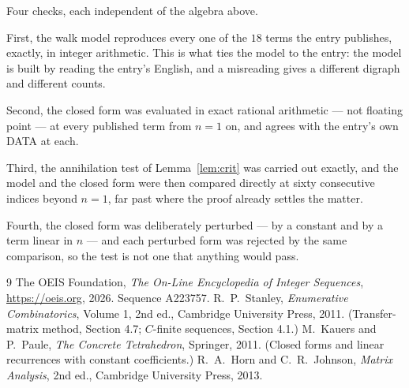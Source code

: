 \documentclass[11pt,a4paper]{article}
\theoremstyle{plain}
\theoremstyle{definition}
\begin{document}
Four checks, each independent of the algebra above.

First, the walk model reproduces every one of the $18$ terms the entry publishes,
exactly, in integer arithmetic. This is what ties the model to the entry: the model is built
by reading the entry's English, and a misreading gives a different digraph and different
counts.

Second, the closed form was evaluated in exact rational arithmetic --- not floating point ---
at every published term from $n=1$ on, and agrees with the entry's own DATA at each.

Third, the annihilation test of Lemma~\ref{lem:crit} was carried out exactly, and the model
and the closed form were then compared directly at sixty consecutive indices beyond
$n=1$, far past where the proof already settles the matter.

Fourth, the closed form was deliberately perturbed --- by a constant and by a term linear in
$n$ --- and each perturbed form was rejected by the same comparison, so the test is not one
that anything would pass.

\begin{thebibliography}{9}
 The OEIS Foundation, \emph{The On-Line Encyclopedia of Integer
Sequences}, \url{https://oeis.org}, 2026. Sequence A223757.
 R.~P.~Stanley, \emph{Enumerative Combinatorics}, Volume 1, 2nd ed.,
Cambridge University Press, 2011. (Transfer-matrix method, Section 4.7; $C$-finite sequences,
Section 4.1.)
 M.~Kauers and P.~Paule, \emph{The Concrete Tetrahedron}, Springer, 2011.
(Closed forms and linear recurrences with constant coefficients.)
 R.~A.~Horn and C.~R.~Johnson, \emph{Matrix Analysis}, 2nd ed., Cambridge
University Press, 2013.
\end{thebibliography}
\end{document}
